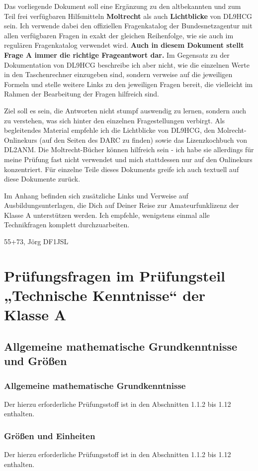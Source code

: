 \documentclass[8pt]{article}
\begin{document}
Das vorliegende Dokument soll eine Ergänzung zu den altbekannten und zum Teil frei verfügbaren Hilfsmitteln \textbf{Moltrecht} als auch \textbf{Lichtblicke} von DL9HCG sein. Ich verwende dabei den offiziellen Fragenkatalog der Bundesnetzagentur mit allen verfügbaren Fragen in exakt der gleichen Reihenfolge, wie sie auch im regulären Fragenkatalog verwendet wird. \textbf{Auch in diesem Dokument stellt Frage A immer die richtige Frageantwort dar.} Im Gegensatz zu der Dokumentation von DL9HCG beschreibe ich aber nicht, wie die einzelnen Werte in den Taschenrechner einzugeben sind, sondern verweise auf die jeweiligen Formeln und stelle weitere Links zu den jeweiligen Fragen bereit, die vielleicht im Rahmen der Bearbeitung der Fragen hilfreich sind.

Ziel soll es sein, die Antworten nicht stumpf auswendig zu lernen, sondern auch zu verstehen, was sich hinter den einzelnen Fragestellungen verbirgt. Als begleitendes Material empfehle ich die Lichtblicke von DL9HCG, den Molrecht-Onlinekurs (auf den Seiten des DARC zu finden) sowie das Lizenzkochbuch von DL2ANM. Die Moltrecht-Bücher können hilfreich sein - ich habe sie allerdings für meine Prüfung fast nicht verwendet und mich stattdessen nur auf den Onlinekurs konzentriert. Für einzelne Teile dieses Dokuments greife ich auch textuell auf diese Dokumente zurück.

Im Anhang befinden sich zusätzliche Links und Verweise auf Ausbildungsunterlagen, die Dich auf Deiner Reise zur Amateurfunklizenz der Klasse A unterstützen werden. Ich empfehle, wenigstens einmal alle Technikfragen komplett durchzuarbeiten.

55+73,
Jörg
DF1JSL
 
\section {Prüfungsfragen im Prüfungsteil „Technische Kenntnisse“ der Klasse A}
\subsection {Allgemeine mathematische Grundkenntnisse und Größen}
\subsubsection {Allgemeine mathematische Grundkenntnisse}
Der hierzu erforderliche Prüfungsstoff ist in den Abschnitten 1.1.2 bis 1.12 enthalten.\\
\subsubsection{Größen und Einheiten}
Der hierzu erforderliche Prüfungsstoff ist in den Abschnitten 1.1.2 bis 1.12 enthalten.
\end{document}
